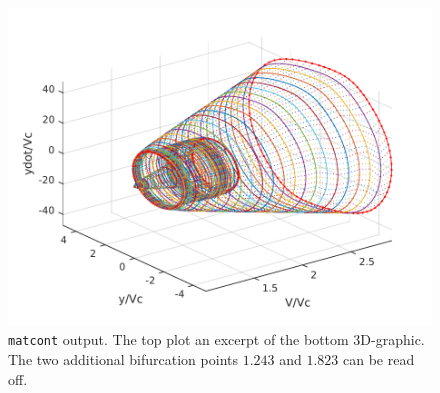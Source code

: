 \begin{figure}

\includegraphics{./plots/matcont.pdf}
\caption{\texttt{matcont} output. The top plot an excerpt of the bottom 3D-graphic. The two additional bifurcation points $1.243$ and $1.823$ can be read off.}
\end{figure}




